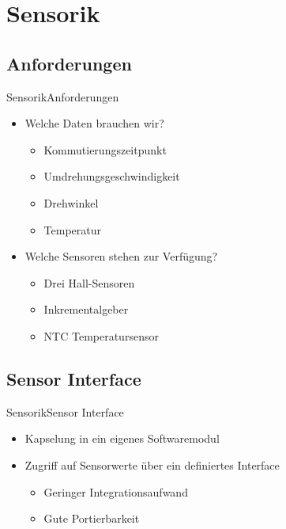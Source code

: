 \section{Sensorik}
\subsection{Anforderungen}

\begin{frame}{Sensorik}{Anforderungen}
  \begin{itemize}
    \item Welche Daten brauchen wir?
    \begin{itemize}
    \item Kommutierungszeitpunkt
    \item Umdrehungsgeschwindigkeit
    \item Drehwinkel
    \item Temperatur
    \end{itemize}
    \item Welche Sensoren stehen zur Verfügung?
    \begin{itemize}
      \item Drei Hall-Sensoren
      \item Inkrementalgeber
      \item NTC Temperatursensor
    \end{itemize}
  \end{itemize}
\end{frame}


\subsection{Sensor Interface}

\begin{frame}{Sensorik}{Sensor Interface}	
  \begin{itemize}
    \item Kapselung in ein eigenes Softwaremodul
    \item Zugriff auf Sensorwerte über ein definiertes Interface
    \begin{itemize}
      \item Geringer Integrationsaufwand
      \item Gute Portierbarkeit
    \end{itemize}
  \end{itemize}
\end{frame}

